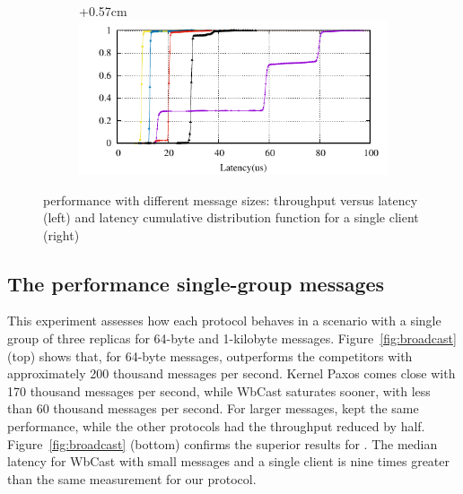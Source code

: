 \begin{figure}[htp!]
\begin{subfigure}{\columnwidth}
  \end{subfigure}
  \begin{subfigure}{\columnwidth}
    \advance\leftskip+0.57cm
    \includegraphics[width=0.96\columnwidth]{figures/benchmark/graphs/figure-performance-vs-size-single-group-cdf-from-4k}
  \end{subfigure}
  \caption{\libname performance with different message sizes: throughput versus latency (left) and latency cumulative distribution function for a single client (right)}
  \label{fig:1group_message_size}
\end{figure}

\subsection{The performance single-group messages}
\label{sec:evaluation:broadcast}

This experiment assesses how each protocol behaves in a scenario with a single group of three replicas for 64-byte and 1-kilobyte messages.
Figure~\ref{fig:broadcast} (top) shows that, for 64-byte messages, \libname outperforms the competitors with approximately 200 thousand messages per second. 
Kernel Paxos comes close with 170 thousand messages per second, while WbCast saturates sooner, with less than 60 thousand messages per second.
For larger messages, \libname kept the same performance, while the other protocols had the throughput reduced by half.
Figure~\ref{fig:broadcast} (bottom) confirms the superior results for \libname. The median latency for WbCast with small messages and a single client is nine times greater than the same measurement for our protocol.

